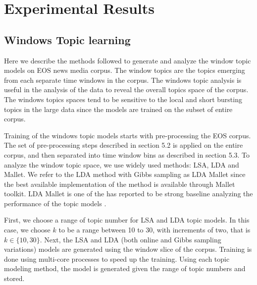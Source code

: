 \section{Experimental Results}

\subsection{Windows Topic learning}
Here we describe the methods followed to generate and analyze the window topic models on EOS news media corpus. The window topics are the topics emerging from each separate time windows in the corpus. The windows topic analysis is useful in the analysis of the data to reveal the overall topics space of the corpus. The windows topics spaces tend to be sensitive to the local and short bursting topics in the large data since the models are trained on the subset of entire corpus. 

Training of the windows topic models starts with pre-processing the EOS corpus. The set of pre-processing steps described in section 5.2 is applied on the entire corpus, and then separated into time window bins as described in section 5.3. To analyze the window topic space, we use widely used methods: LSA, LDA and Mallet. We refer to the LDA method with Gibbs sampling as LDA Mallet since the best available implementation of the method is available through Mallet toolkit. LDA Mallet is one of the has reported to be strong baseline analyzing the performance of the topic models \cite{Greene2016}. 

First, we choose a range of topic number for LSA and LDA topic models. In this case, we choose $k$ to be a range between 10 to 30, with increments of two, that is $k \in \{10, 30\}$. Next, the LSA and LDA (both online and Gibbs sampling variations) models are generated using the window slice of the corpus. Training is done using multi-core processes to speed up the training. Using each topic modeling method, the model is generated given the range of topic numbers and stored.


